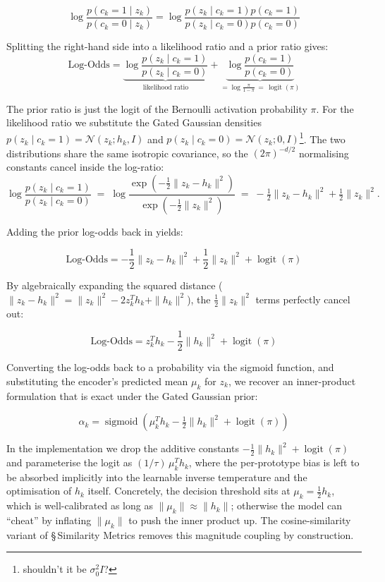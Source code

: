 \documentclass[11pt, a4paper]{article}
\begin{document}
\[
\log \frac{p(c_k = 1 \mid z_k)}{p(c_k = 0 \mid z_k)} = \log \frac{p(z_k \mid c_k = 1) p(c_k = 1)}{p(z_k \mid c_k = 0) p(c_k = 0)}
\]

Splitting the right-hand side into a likelihood ratio and a prior ratio gives:
\[
\text{Log-Odds} = \underbrace{\log \frac{p(z_k \mid c_k = 1)}{p(z_k \mid c_k = 0)}}_{\text{likelihood ratio}} + \underbrace{\log \frac{p(c_k = 1)}{p(c_k = 0)}}_{= \log \frac{\pi}{1-\pi} \,=\, \operatorname{logit}(\pi)}
\]

The prior ratio is just the logit of the Bernoulli activation probability $\pi$. For the likelihood ratio we substitute the Gated Gaussian densities $p(z_k \mid c_k = 1) = \mathcal{N}(z_k; h_k, I)$ and $p(z_k \mid c_k = 0) = \mathcal{N}(z_k; 0, I)${\color{red}\footnote{\color{red}shouldn't it be $\sigma_0^2 I$?}}. The two distributions share the same isotropic covariance, so the $(2\pi)^{-d/2}$ normalising constants cancel inside the log-ratio:
\[
\log \frac{p(z_k \mid c_k = 1)}{p(z_k \mid c_k = 0)}
\;=\;
\log \frac{\exp\!\left(-\tfrac{1}{2}\|z_k - h_k\|^2\right)}{\exp\!\left(-\tfrac{1}{2}\|z_k\|^2\right)}
\;=\;
-\tfrac{1}{2}\|z_k - h_k\|^2 + \tfrac{1}{2}\|z_k\|^2.
\]

Adding the prior log-odds back in yields:

\[
\text{Log-Odds} = -\frac{1}{2}\|z_k - h_k\|^2 + \frac{1}{2}\|z_k\|^2 + \operatorname{logit}(\pi)
\]

By algebraically expanding the squared distance ($\|z_k - h_k\|^2 = \|z_k\|^2 - 2 z_k^T h_k + \|h_k\|^2$), the $\frac{1}{2}\|z_k\|^2$ terms perfectly cancel out:

\[
\text{Log-Odds} = z_k^T h_k - \frac{1}{2}\|h_k\|^2 + \operatorname{logit}(\pi)
\]

Converting the log-odds back to a probability via the sigmoid function, and substituting the encoder's predicted mean $\mu_k$ for $z_k$, we recover an inner-product formulation that is exact under the Gated Gaussian prior:

\[
\alpha_k = \operatorname{sigmoid}\!\left( \mu_k^T h_k - \tfrac{1}{2}\|h_k\|^2 + \operatorname{logit}(\pi) \right)
\]

In the implementation we drop the additive constants $-\tfrac{1}{2}\|h_k\|^2 + \operatorname{logit}(\pi)$ and parameterise the logit as $(1/\tau)\,\mu_k^T h_k$, where the per-prototype bias is left to be absorbed implicitly into the learnable inverse temperature and the optimisation of $h_k$ itself. Concretely, the decision threshold sits at $\mu_k = \tfrac{1}{2}h_k$, which is well-calibrated as long as $\|\mu_k\| \approx \|h_k\|$; otherwise the model can ``cheat'' by inflating $\|\mu_k\|$ to push the inner product up. The cosine-similarity variant of \S\,Similarity Metrics removes this magnitude coupling by construction.
\end{document}
